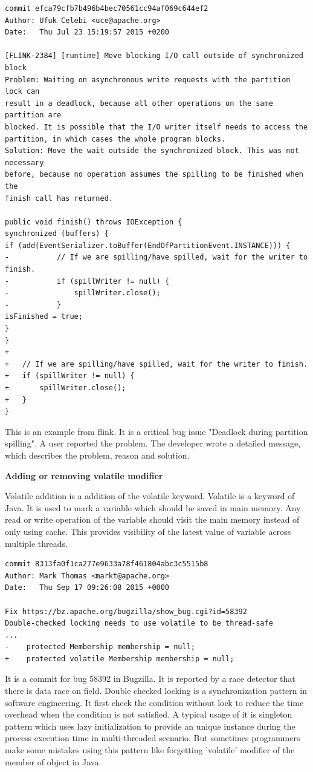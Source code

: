 \documentclass[conference]{IEEEtran}
\begin{document}
\begin{lstlisting}
commit efca79cfb7b496b4bec70561cc94af069c644ef2
Author: Ufuk Celebi <uce@apache.org>
Date:   Thu Jul 23 15:19:57 2015 +0200

[FLINK-2384] [runtime] Move blocking I/O call outside of synchronized block
Problem: Waiting on asynchronous write requests with the partition lock can
result in a deadlock, because all other operations on the same partition are
blocked. It is possible that the I/O writer itself needs to access the
partition, in which cases the whole program blocks.
Solution: Move the wait outside the synchronized block. This was not necessary
before, because no operation assumes the spilling to be finished when the
finish call has returned.

public void finish() throws IOException {
synchronized (buffers) {
if (add(EventSerializer.toBuffer(EndOfPartitionEvent.INSTANCE))) {
-			// If we are spilling/have spilled, wait for the writer to finish.
-			if (spillWriter != null) {
-				spillWriter.close();
-			}
isFinished = true;
}
}
+
+	// If we are spilling/have spilled, wait for the writer to finish.
+	if (spillWriter != null) {
+		spillWriter.close();
+	}
}
\end{lstlisting}

This is an example from flink. It is a critical bug issue "Deadlock during partition spilling". A user reported the problem. The developer wrote a detailed message, which describes the problem, reason and solution.


\textbf{Adding or removing volatile modifier}

Volatile addition is a addition of the volatile keyword. Volatile is a keyword of Java. It is used to mark a variable which should be saved in main memory. Any read or write operation of the variable should visit the main memory instead of only using cache. This provides visibility of the latest value of variable across multiple threads. 

\begin{lstlisting}
commit 8313fa0f1ca277e9633a78f461804abc3c5515b8
Author: Mark Thomas <markt@apache.org>
Date:   Thu Sep 17 09:26:08 2015 +0000

Fix https://bz.apache.org/bugzilla/show_bug.cgi?id=58392
Double-checked locking needs to use volatile to be thread-safe
...
-    protected Membership membership = null;
+    protected volatile Membership membership = null;
\end{lstlisting}
It is a commit for bug 58392 in Bugzilla. It is reported by a race detector that there is data race on field. Double checked locking is a synchronization pattern in software engineering. It first check the condition without lock to reduce the time overhead when the condition is not satisfied. A typical usage of it is singleton pattern which uses lazy initialization to provide an unique instance during the process execution time in multi-threaded scenario. But sometimes programmers make some mistakes using this pattern like forgetting 'volatile' modifier of the member of object in Java.
\end{document}
